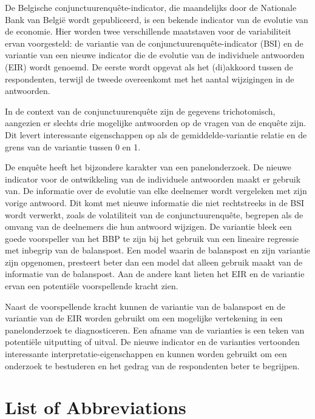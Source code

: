 \documentclass[12pt,a4paper,oneside]{book}
\begin{document}
De Belgische conjunctuurenquête-indicator, die maandelijks door de Nationale Bank van België wordt gepubliceerd, is een bekende indicator van de evolutie van de economie.
Hier worden twee verschillende maatstaven voor de variabiliteit ervan voorgesteld: de variantie van de conjunctuurenquête-indicator (BSI) en de variantie van een nieuwe indicator die de evolutie van de individuele antwoorden (EIR) wordt genoemd.
De eerste wordt opgevat als het (di)akkoord tussen de respondenten, terwijl de tweede overeenkomt met het aantal wijzigingen in de antwoorden.

In de context van de conjunctuurenquête zijn de gegevens trichotomisch, aangezien er slechts drie mogelijke antwoorden op de vragen van de enquête zijn. 
Dit levert interessante eigenschappen op als de gemiddelde-variantie relatie en de grens van de variantie tussen 0 en 1.

De enquête heeft het bijzondere karakter van een panelonderzoek. De nieuwe indicator voor de ontwikkeling van de individuele antwoorden maakt er gebruik van. De informatie over de evolutie van elke deelnemer wordt vergeleken met zijn vorige antwoord.
Dit komt met nieuwe informatie die niet rechtstreeks in de BSI wordt verwerkt, zoals de volatiliteit van de conjunctuurenquête, begrepen als de omvang van de deelnemers die hun antwoord wijzigen.
De variantie bleek een goede voorspeller van het BBP te zijn bij het gebruik van een lineaire regressie met inbegrip van de balanspost. Een model waarin de balanspost en zijn variantie zijn opgenomen, presteert beter dan een model dat alleen gebruik maakt van de informatie van de balanspost.
Aan de andere kant lieten het EIR en de variantie ervan een potentiële voorspellende kracht zien.

Naast de voorspellende kracht kunnen de variantie van de balanspost en de variantie van de EIR worden gebruikt om een mogelijke vertekening in een panelonderzoek te diagnosticeren. Een afname van de varianties is een teken van potentiële uitputting of uitval.
De nieuwe indicator en de varianties vertoonden interessante interpretatie-eigenschappen en kunnen worden gebruikt om een onderzoek te bestuderen en het gedrag van de respondenten beter te begrijpen.





\chapter*{List of Abbreviations}
\end{document}
